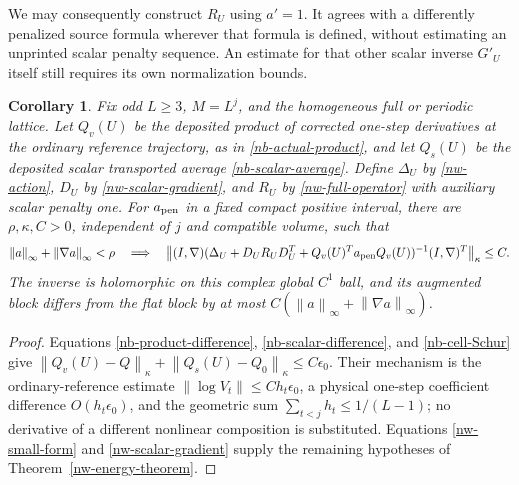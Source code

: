 \documentclass[11pt]{article}
\newtheorem{corollary}[theorem]{Corollary}
\theoremstyle{remark}
\newcommand{\norm}[1]{\left\|#1\right\|}
\begin{document}
We may consequently construct $R_U$ using $a'=1$.
It agrees with a differently penalized source formula wherever
that formula is defined, without estimating an unprinted scalar
penalty sequence. An estimate for that other scalar inverse
$G'_U$ itself still requires its own normalization bounds.

\begin{corollary}\label{nw-wilson-corollary}
Fix odd $L\ge3$, $M=L^j$, and the homogeneous full or periodic
lattice. Let $Q_v(U)$ be the deposited product of corrected
one-step derivatives at the ordinary reference trajectory, as
in \eqref{nb-actual-product}, and let $Q_s(U)$ be the deposited
scalar transported average \eqref{nb-scalar-average}.
Define $\Delta_U$ by \eqref{nw-action}, $D_U$ by
\eqref{nw-scalar-gradient}, and $R_U$ by
\eqref{nw-full-operator} with auxiliary scalar penalty one.
For $a_{\rm pen}$ in a fixed compact positive interval, there are
$\rho,\kappa,C>0$, independent of $j$ and compatible volume, such that
\begin{equation}\label{nw-final}
 \norm{a}_\infty+\norm{\nabla a}_\infty<\rho
 \quad\Longrightarrow\quad
 \norm{(I,\nabla)
 (\Delta_U+D_UR_UD_U^T+Q_v(U)^Ta_{\rm pen}Q_v(U))^{-1}
 (I,\nabla)^T}_\kappa\le C.
\end{equation}
The inverse is holomorphic on this complex global $C^1$ ball,
and its augmented block differs from the flat block by at most
$C(\norm{a}_\infty+\norm{\nabla a}_\infty)$.
\end{corollary}

\begin{proof}
Equations \eqref{nb-product-difference},
\eqref{nb-scalar-difference}, and \eqref{nb-cell-Schur}
give $\norm{Q_v(U)-Q}_\kappa+\norm{Q_s(U)-Q_0}_\kappa
\le C\epsilon_0$.
Their mechanism is the ordinary-reference estimate
$\norm{\log V_t}\le Ch_t\epsilon_0$, a physical one-step
coefficient difference $O(h_t\epsilon_0)$, and the geometric
sum $\sum_{t<j}h_t\le1/(L-1)$; no derivative of a different
nonlinear composition is substituted.
Equations \eqref{nw-small-form} and \eqref{nw-scalar-gradient}
supply the remaining hypotheses of Theorem~\ref{nw-energy-theorem}.
\end{proof}
\end{document}
